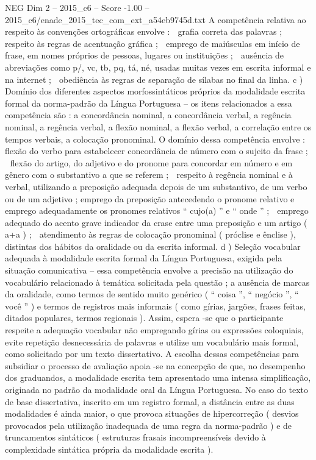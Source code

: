 \begin{textsample}{NEG Dim 2 – 2015\_c6 – Score -1.00 – 2015\_c6/enade\_2015\_tec\_com\_ext\_a54eb9745d.txt}
A competência relativa ao respeito às convenções ortográficas envolve :  grafia correta das palavras ;  respeito às regras de acentuação gráfica ;  emprego de maiúsculas em início de frase, em nomes próprios de pessoas, lugares ou instituições ;  ausência de abreviações como p/, vc, tb, pq, tá, né, usadas muitas vezes em escrita informal e na internet ;  obediência às regras de separação de sílabas no final da linha. c ) Domínio dos diferentes aspectos morfossintáticos próprios da modalidade escrita formal da norma-padrão da Língua Portuguesa – os itens relacionados a essa competência são : a concordância nominal, a concordância verbal, a regência nominal, a regência verbal, a flexão nominal, a flexão verbal, a correlação entre os tempos verbais, a colocação pronominal.
O domínio dessa competência envolve :  flexão do verbo para estabelecer concordância de número com o sujeito da frase ;  flexão do artigo, do adjetivo e do pronome para concordar em número e em gênero com o substantivo a que se referem ;  respeito à regência nominal e à verbal, utilizando a preposição adequada depois de um substantivo, de um verbo ou de um adjetivo ; emprego da preposição antecedendo o pronome relativo e emprego adequadamente os pronomes relativos “ cujo(a) ” e “ onde ” ;  emprego adequado do acento grave indicador da crase entre uma preposição e um artigo ( a+a ) ;  atendimento às regras de colocação pronominal ( próclise e ênclise ), distintas dos hábitos da oralidade ou da escrita informal. d ) Seleção vocabular adequada à modalidade escrita formal da Língua Portuguesa, exigida pela situação comunicativa – essa competência envolve a precisão na utilização do vocabulário relacionado à temática solicitada pela questão ; a ausência de marcas da oralidade, como termos de sentido muito genérico ( “ coisa ”, “ negócio ”, “ você ” ) e termos de registros mais informais ( como gírias, jargões, frases feitas, ditados populares, termos regionais ).
Assim, espera -se que o participante respeite a adequação vocabular não empregando gírias ou expressões coloquiais, evite repetição desnecessária de palavras e utilize um vocabulário mais formal, como solicitado por um texto dissertativo.
A escolha dessas competências para subsidiar o processo de avaliação apoia -se na concepção de que, no desempenho dos graduandos, a modalidade escrita tem apresentado uma intensa simplificação, originada no padrão da modalidade oral da Língua Portuguesa.
No caso do texto de base dissertativa, inscrito em um registro formal, a distância entre as duas modalidades é ainda maior, o que provoca situações de hipercorreção ( desvios provocados pela utilização inadequada de uma regra da norma-padrão ) e de truncamentos sintáticos ( estruturas frasais incompreensíveis devido à complexidade sintática própria da modalidade escrita ).

\end{textsample}
